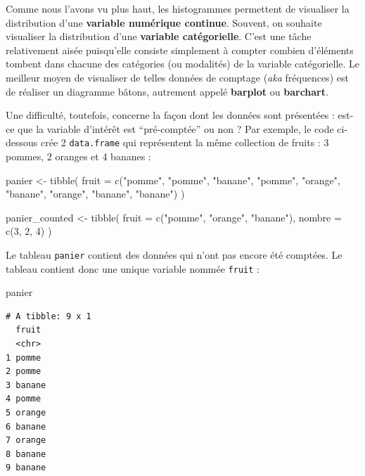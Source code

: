 \documentclass[
  letterpaper,
  DIV=11,
  numbers=noendperiod]{scrreprt}
\newenvironment{Shaded}{\begin{snugshade}}{\end{snugshade}}
\newcommand{\AttributeTok}[1]{\textcolor[rgb]{0.40,0.45,0.13}{#1}}
\newcommand{\DecValTok}[1]{\textcolor[rgb]{0.68,0.00,0.00}{#1}}
\newcommand{\FunctionTok}[1]{\textcolor[rgb]{0.28,0.35,0.67}{#1}}
\newcommand{\NormalTok}[1]{\textcolor[rgb]{0.00,0.23,0.31}{#1}}
\newcommand{\OtherTok}[1]{\textcolor[rgb]{0.00,0.23,0.31}{#1}}
\newcommand{\StringTok}[1]{\textcolor[rgb]{0.13,0.47,0.30}{#1}}
\begin{document}
Comme nous l'avons vu plus haut, les histogrammes permettent de
visualiser la distribution d'une \textbf{variable numérique continue}.
Souvent, on souhaite visualiser la distribution d'une \textbf{variable
catégorielle}. C'est une tâche relativement aisée puisqu'elle consiste
simplement à compter combien d'éléments tombent dans chacune des
catégories (ou modalités) de la variable catégorielle. Le meilleur moyen
de visualiser de telles données de comptage (\emph{aka} fréquences) est
de réaliser un diagramme bâtons, autrement appelé \textbf{barplot} ou
\textbf{barchart}.

Une difficulté, toutefois, concerne la façon dont les données sont
présentées : est-ce que la variable d'intérêt est ``pré-comptée'' ou non
? Par exemple, le code ci-dessous crée 2 \texttt{data.frame} qui
représentent la même collection de fruits : 3 pommes, 2 oranges et 4
bananes :

\begin{Shaded}
\begin{Highlighting}[]
\NormalTok{panier }\OtherTok{\textless{}{-}} \FunctionTok{tibble}\NormalTok{(}
  \AttributeTok{fruit =} \FunctionTok{c}\NormalTok{(}\StringTok{"pomme"}\NormalTok{, }\StringTok{"pomme"}\NormalTok{, }\StringTok{"banane"}\NormalTok{, }\StringTok{"pomme"}\NormalTok{, }\StringTok{"orange"}\NormalTok{, }\StringTok{"banane"}\NormalTok{, }\StringTok{"orange"}\NormalTok{, }\StringTok{"banane"}\NormalTok{, }\StringTok{"banane"}\NormalTok{)}
\NormalTok{)}

\NormalTok{panier\_counted }\OtherTok{\textless{}{-}} \FunctionTok{tibble}\NormalTok{(}
  \AttributeTok{fruit =} \FunctionTok{c}\NormalTok{(}\StringTok{"pomme"}\NormalTok{, }\StringTok{"orange"}\NormalTok{, }\StringTok{"banane"}\NormalTok{),}
  \AttributeTok{nombre =} \FunctionTok{c}\NormalTok{(}\DecValTok{3}\NormalTok{, }\DecValTok{2}\NormalTok{, }\DecValTok{4}\NormalTok{)}
\NormalTok{)}
\end{Highlighting}
\end{Shaded}

Le tableau \texttt{panier} contient des données qui n'ont pas encore été
comptées. Le tableau contient donc une unique variable nommée
\texttt{fruit} :

\begin{Shaded}
\begin{Highlighting}[]
\NormalTok{panier}
\end{Highlighting}
\end{Shaded}

\begin{verbatim}
# A tibble: 9 x 1
  fruit 
  <chr> 
1 pomme 
2 pomme 
3 banane
4 pomme 
5 orange
6 banane
7 orange
8 banane
9 banane
\end{verbatim}
\end{document}
